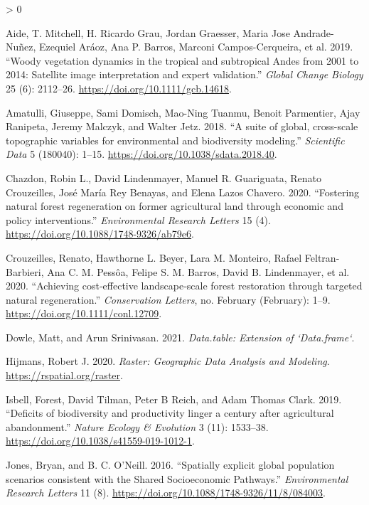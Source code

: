 \documentclass[
]{article}
\newlength{\cslhangindent}
\newenvironment{CSLReferences}[2] %
 {%
  \setlength{\parindent}{0pt}
  \ifodd #1 \everypar{\setlength{\hangindent}{\cslhangindent}}\ignorespaces\fi
  \ifnum #2 > 0
  \setlength{\parskip}{#2\baselineskip}
  \fi
 }%
 {}
\begin{document}
\hypertarget{refs}{}
\begin{CSLReferences}{1}{0}
\leavevmode\hypertarget{ref-Aide2019}{}%
Aide, T. Mitchell, H. Ricardo Grau, Jordan Graesser, Maria Jose Andrade-Nuñez, Ezequiel Aráoz, Ana P. Barros, Marconi Campos-Cerqueira, et al. 2019. {``{Woody vegetation dynamics in the tropical and subtropical Andes from 2001 to 2014: Satellite image interpretation and expert validation}.''} \emph{Global Change Biology} 25 (6): 2112--26. \url{https://doi.org/10.1111/gcb.14618}.

\leavevmode\hypertarget{ref-Amatulli2018}{}%
Amatulli, Giuseppe, Sami Domisch, Mao-Ning Tuanmu, Benoit Parmentier, Ajay Ranipeta, Jeremy Malczyk, and Walter Jetz. 2018. {``{A suite of global, cross-scale topographic variables for environmental and biodiversity modeling}.''} \emph{Scientific Data} 5 (180040): 1--15. \url{https://doi.org/10.1038/sdata.2018.40}.

\leavevmode\hypertarget{ref-Chazdon2020}{}%
Chazdon, Robin L., David Lindenmayer, Manuel R. Guariguata, Renato Crouzeilles, José María Rey Benayas, and Elena Lazos Chavero. 2020. {``{Fostering natural forest regeneration on former agricultural land through economic and policy interventions}.''} \emph{Environmental Research Letters} 15 (4). \url{https://doi.org/10.1088/1748-9326/ab79e6}.

\leavevmode\hypertarget{ref-Crouzeilles2020}{}%
Crouzeilles, Renato, Hawthorne L. Beyer, Lara M. Monteiro, Rafael Feltran-Barbieri, Ana C. M. Pessôa, Felipe S. M. Barros, David B. Lindenmayer, et al. 2020. {``{Achieving cost‐effective landscape‐scale forest restoration through targeted natural regeneration}.''} \emph{Conservation Letters}, no. February (February): 1--9. \url{https://doi.org/10.1111/conl.12709}.

\leavevmode\hypertarget{ref-R-data.table}{}%
Dowle, Matt, and Arun Srinivasan. 2021. \emph{Data.table: Extension of `Data.frame`}.

\leavevmode\hypertarget{ref-R-raster}{}%
Hijmans, Robert J. 2020. \emph{Raster: Geographic Data Analysis and Modeling}. \url{https://rspatial.org/raster}.

\leavevmode\hypertarget{ref-Isbell2019}{}%
Isbell, Forest, David Tilman, Peter B Reich, and Adam Thomas Clark. 2019. {``{Deficits of biodiversity and productivity linger a century after agricultural abandonment}.''} \emph{Nature Ecology {\&} Evolution} 3 (11): 1533--38. \url{https://doi.org/10.1038/s41559-019-1012-1}.

\leavevmode\hypertarget{ref-Jones2016}{}%
Jones, Bryan, and B. C. O'Neill. 2016. {``{Spatially explicit global population scenarios consistent with the Shared Socioeconomic Pathways}.''} \emph{Environmental Research Letters} 11 (8). \url{https://doi.org/10.1088/1748-9326/11/8/084003}.


\end{CSLReferences}
\end{document}
